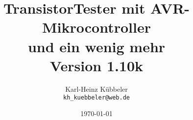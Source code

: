 \documentclass[pdftex,12pt,a4paper,oneside,english]{report}
\begin{document}
\title{TransistorTester mit AVR-Mikrocontroller \\
und ein wenig mehr\\
Version 1.10k \\
}
\author{Karl-Heinz Kübbeler\\
\texttt{kh\_kuebbeler@web.de}}
\date{\today}
\maketitle
\tableofcontents













 
 
 
 
 
 





\end{document}
